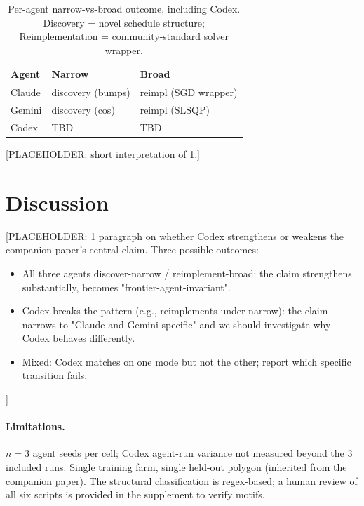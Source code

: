 \documentclass{article}
\providecommand{\CodexNarrowVerdict}{TBD}
\providecommand{\CodexBroadVerdict}{TBD}
\begin{document}
\begin{table}[t]
\caption{Per-agent narrow-vs-broad outcome, including Codex.
Discovery = novel schedule structure;
Reimplementation = community-standard solver wrapper.}
\label{tab:nbsummary}
\vskip 0.1in
\begin{center}
\begin{small}
\begin{sc}
\begin{tabular}{lll}
\toprule
Agent   & Narrow            & Broad                  \\
\midrule
Claude  & discovery (bumps) & reimpl (SGD wrapper)   \\
Gemini  & discovery (cos)   & reimpl (SLSQP)         \\
Codex   & \CodexNarrowVerdict & \CodexBroadVerdict   \\
\bottomrule
\end{tabular}
\end{sc}
\end{small}
\end{center}
\vskip -0.1in
\end{table}

[PLACEHOLDER: short interpretation of \cref{tab:nbsummary}.]

\section{Discussion}

[PLACEHOLDER: 1 paragraph on whether Codex strengthens or weakens the
companion paper's central claim. Three possible outcomes:
\begin{itemize}
\item All three agents discover-narrow / reimplement-broad: the claim
strengthens substantially, becomes "frontier-agent-invariant".
\item Codex breaks the pattern (e.g., reimplements under narrow):
the claim narrows to "Claude-and-Gemini-specific" and we should
investigate why Codex behaves differently.
\item Mixed: Codex matches on one mode but not the other; report
which specific transition fails.
\end{itemize}]

\paragraph{Limitations.}
$n{=}3$ agent seeds per cell; Codex agent-run variance not measured
beyond the 3 included runs. Single training farm, single held-out
polygon (inherited from the companion paper).
The structural classification is regex-based; a human review of all
six scripts is provided in the supplement to verify motifs.
\end{document}
